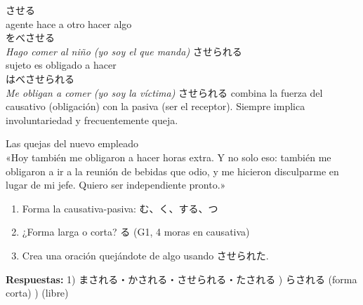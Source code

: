   {させる\\\small agente hace a otro hacer algo\\\small {}をべさせる\\\textit{Hago comer al niño (yo soy el que manda)}}
  {させられる\\\small sujeto es obligado a hacer\\\small {}はべさせられる\\\textit{Me obligan a comer (yo soy la víctima)}}
  {させられる combina la fuerza del causativo (obligación) con la pasiva (ser el receptor). Siempre implica involuntariedad y frecuentemente queja.}



{Las quejas del nuevo empleado\\[0.4em]
  «Hoy también me obligaron a hacer horas extra. Y no solo eso: también me obligaron a ir a la reunión de bebidas que odio, y me hicieron disculparme en lugar de mi jefe. Quiero ser independiente pronto.»}

\begin{tcolorbox}[ejerciciobox, title={\emoji{pencil} Ejercicios}]
\begin{enumerate}
  \item Forma la causativa-pasiva: む、く、する、つ
  \item ¿Forma larga o corta? る (G1, 4 moras en causativa)
  \item Crea una oración quejándote de algo usando させられた.
\end{enumerate}
\textbf{Respuestas:}
1) まされる・かされる・させられる・たされる ) らされる (forma corta) ) (libre)
\end{tcolorbox}

